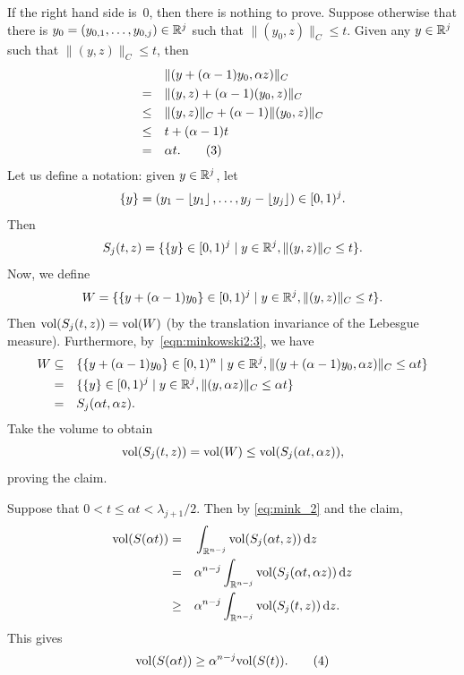 \documentclass{Vorlesungstemplate_English} %
\begin{document}
\begin{pf}
    If the right hand side is~\(0\), then there is nothing to prove.
    Suppose otherwise that there is \(y_0 = (y_{0,1}, \dots, y_{0,j}) \in \mathbb{R}^j\) such that \(\|(y_0, z)\|_C \le t\).
    Given any \(y \in \mathbb{R}^j\) such that \(\|(y, z)\|_C \le t\), then
    \begin{align}
        & \|(y + (\alpha - 1) y_0, \alpha z)\|_C \notag\\
        = \quad & \|(y, z) + (\alpha - 1) (y_0, z)\|_C \notag\\
        \le \quad & \|(y, z)\|_C + (\alpha - 1) \|(y_0, z)\|_C \notag\\
        \le  \quad & t + (\alpha - 1) t \notag\\
        = \quad & \alpha t. \tag{3}
        \label{eqn:minkowski2:3}
    \end{align}
    Let us define a notation: given \(y \in \mathbb{R}^j\), let
    \begin{equation*}
        \{y\}
        = (y_1 - \left\lfloor y_1\right\rfloor, \dots, y_j - \left\lfloor y_j\right\rfloor) \in [0,1)^j.
    \end{equation*}
    Then
    \begin{equation*}
        S_j(t, z)
        = \{\{y \}\in [0,1)^j \mid y \in \mathbb{R}^j, \|(y, z)\|_C \le t\}.
    \end{equation*}
    Now, we define
    \begin{equation*}
        W
        = \{\{y + (\alpha - 1) y_0\} \in [0,1)^j \mid y \in \mathbb{R}^j, \|(y, z)\|_C \le t\}.
    \end{equation*}
    Then \(\text{vol}(S_j(t, z)) = \text{vol}(W)\) (by the translation invariance of the Lebesgue measure).
    Furthermore, by~\cref{eqn:minkowski2:3}, we have
    \begin{align*}
        W
        \subseteq \quad & \{\{y + (\alpha - 1) y_0\} \in [0,1)^n \mid y \in \mathbb{R}^j, \|(y + (\alpha - 1) y_0, \alpha z)\|_C \le \alpha t\} \\
        = \quad & \{\{y\} \in [0,1)^j \mid y \in \mathbb{R}^j, \|(y, \alpha z)\|_C \le \alpha t\} \\
        = \quad & S_j(\alpha t, \alpha z).
    \end{align*}
    Take the volume to obtain
    \begin{equation*}
        \text{vol}(S_j(t, z))
        = \text{vol}(W)
        \le \text{vol}(S_j(\alpha t, \alpha z)),
    \end{equation*}
    proving the claim.

    Suppose that \(0 < t \le \alpha t < \lambda_{j+1} / 2\).
    Then by \cref{eq:mink_2} and the claim,
    \begin{align*}
        \vol(S(\alpha t))
        = \quad & \int_{\R^{n-j}} \vol(S_j(\alpha t, z)) \dl{z} \\
        = \quad & \alpha^{n-j} \int_{\R^{n-j}} \vol(S_j(\alpha t, \alpha z)) \dl{z} \\
        \ge \quad & \alpha^{n-j} \int_{\R^{n-j}} \vol(S_j(t, z)) \dl{z}.
    \end{align*}
    This gives
    \begin{equation}
        \text{vol}(S(\alpha t))
        \ge \alpha^{n-j} \text{vol}(S(t)). \tag{4}
        \label{eqn:minkowski2:4}
    \end{equation}


\end{pf}
\end{document}
